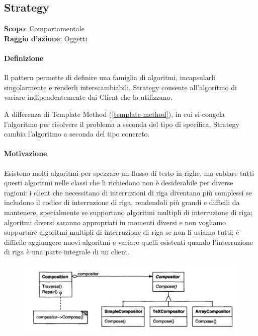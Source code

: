 \subsection{Strategy}
\label{strategy}

\textbf{Scopo}: Comportamentale \\
\textbf{Raggio d'azione}: Oggetti

\paragraph{Definizione} Il pattern permette di definire una famiglia di algoritmi, incapsularli singolarmente e renderli interscambiabili. Strategy consente all'algoritmo di variare indipendentemente dai Client che lo utilizzano.

A differenza di Template Method (\ref{template-method}), in cui si congela l'algoritmo per risolvere il problema a seconda del tipo di specifica, Strategy cambia l'algoritmo a seconda del tipo concreto.

\paragraph{Motivazione} Esistono molti algoritmi per spezzare un flusso di testo in righe, ma cablare tutti questi algoritmi nelle classi che li richiedono non è desiderabile per diverse ragioni: i client che necessitano di interruzioni di riga diventano più complessi se includono il codice di interruzione di riga, rendendoli più grandi e difficili da mantenere, specialmente se supportano algoritmi multipli di interruzione di riga; algoritmi diversi saranno appropriati in momenti diversi e non vogliamo supportare algoritmi multipli di interruzione di riga se non li usiamo tutti; è difficile aggiungere nuovi algoritmi e variare quelli esistenti quando l'interruzione di riga è una parte integrale di un client. 

\begin{figure}[H]
    \centering
    \includegraphics[width=0.75\linewidth]{assets/pattern/strategy/strategy-esempio.png}
\end{figure}

